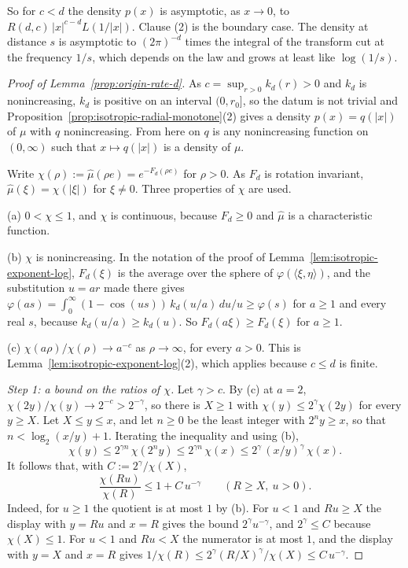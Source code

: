 So for $c < d$ the density $p(x)$ is asymptotic, as $x \to 0$, to
$R(d,c)\,|x|^{c-d}L(1/|x|)$. Clause (2) is the boundary case. The density at distance $s$ is
asymptotic to $(2\pi)^{-d}$ times the integral of the transform cut at the frequency $1/s$,
which depends on the law and grows at least like $\log(1/s)$.

\begin{proof}[Proof of Lemma~\ref{prop:origin-rate-d}]
As $c = \sup_{r>0}k_d(r) > 0$ and $k_d$ is nonincreasing, $k_d$ is positive on an interval
$(0,r_0]$, so the datum is not trivial and Proposition~\ref{prop:isotropic-radial-monotone}(2) gives a density
$p(x) = q(|x|)$ of $\mu$ with $q$ nonincreasing. From here on $q$ is any nonincreasing function
on $(0,\infty)$ such that $x \mapsto q(|x|)$ is a density of $\mu$.

Write $\chi(\rho) := \widehat\mu(\rho e) = e^{-F_d(\rho e)}$ for $\rho > 0$. As $F_d$ is rotation
invariant, $\widehat\mu(\xi) = \chi(|\xi|)$ for $\xi \ne 0$. Three properties of $\chi$ are used.

(a) $0 < \chi \le 1$, and $\chi$ is continuous, because $F_d \ge 0$ and $\widehat\mu$ is a
characteristic function.

(b) $\chi$ is nonincreasing. In the notation of the proof of
Lemma~\ref{lem:isotropic-exponent-log}, $F_d(\xi)$ is the average over the sphere of
$\varphi(\langle\xi,\eta\rangle)$, and the substitution $u = ar$ made there gives
$\varphi(as) = \int_0^\infty(1 - \cos(us))\,k_d(u/a)\,du/u \ge \varphi(s)$ for $a \ge 1$ and every
real $s$, because $k_d(u/a) \ge k_d(u)$. So $F_d(a\xi) \ge F_d(\xi)$ for $a \ge 1$.

(c) $\chi(a\rho)/\chi(\rho) \to a^{-c}$ as $\rho \to \infty$, for every $a > 0$. This is
Lemma~\ref{lem:isotropic-exponent-log}(2), which applies because $c \le d$ is finite.

\emph{Step 1: a bound on the ratios of $\chi$.} Let $\gamma > c$. By (c) at $a = 2$,
$\chi(2y)/\chi(y) \to 2^{-c} > 2^{-\gamma}$, so there is $X \ge 1$ with
$\chi(y) \le 2^{\gamma}\chi(2y)$ for every $y \ge X$. Let $X \le y \le x$, and let $n \ge 0$ be the
least integer with $2^n y \ge x$, so that $n < \log_2(x/y) + 1$. Iterating the inequality and
using (b),
\[
  \chi(y) \le 2^{\gamma n}\,\chi(2^n y) \le 2^{\gamma n}\,\chi(x)
   \le 2^{\gamma}\,(x/y)^{\gamma}\,\chi(x) .
\]
It follows that, with $C := 2^{\gamma}/\chi(X)$,
\begin{equation}\label{eq:rate-ratio-bound}
  \frac{\chi(Ru)}{\chi(R)} \le 1 + C\,u^{-\gamma} \qquad (R \ge X,\ u > 0) .
\end{equation}
Indeed, for $u \ge 1$ the quotient is at most $1$ by (b). For $u < 1$ and $Ru \ge X$ the display
with $y = Ru$ and $x = R$ gives the bound $2^{\gamma}u^{-\gamma}$, and $2^{\gamma} \le C$ because
$\chi(X) \le 1$. For $u < 1$ and $Ru < X$ the numerator is at most $1$, and the display with
$y = X$ and $x = R$ gives $1/\chi(R) \le 2^{\gamma}(R/X)^{\gamma}/\chi(X) \le C\,u^{-\gamma}$.


\end{proof}
